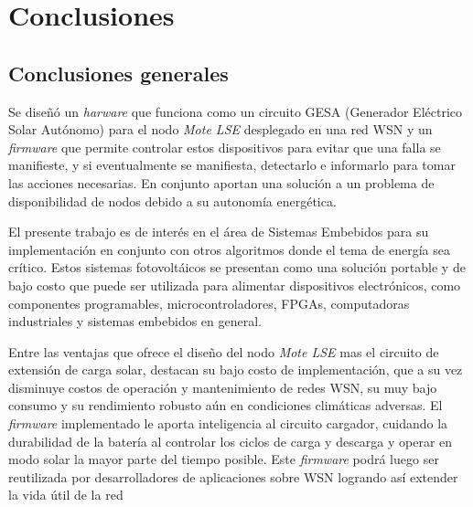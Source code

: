 
\chapter{Conclusiones} %

\label{Chapter5} %

\section{Conclusiones generales}

Se diseñó un \textit{harware} que funciona como un circuito GESA (Generador Eléctrico Solar Autónomo) para el nodo \textit{Mote LSE} desplegado en una red WSN y un \textit{firmware} que permite controlar estos dispositivos para evitar que una falla se manifieste, y si eventualmente se manifiesta, detectarlo e informarlo para tomar las acciones necesarias. En conjunto aportan una solución a un problema de disponibilidad de nodos debido a su autonomía energética.


El presente trabajo es de interés en el área de Sistemas Embebidos para su implementación en conjunto con otros algoritmos donde el tema de energía sea crítico. Estos sistemas fotovoltáicos se presentan como una solución portable y de bajo costo que puede ser utilizada para alimentar dispositivos electrónicos, como componentes programables, microcontroladores, FPGAs, computadoras industriales y sistemas embebidos en general.

Entre las ventajas que ofrece el diseño del nodo \textit{Mote LSE} mas el circuito de extensión de carga solar, destacan su bajo costo de implementación, que a su vez disminuye costos de operación y mantenimiento de redes WSN, su muy bajo consumo y su rendimiento robusto aún en condiciones climáticas adversas. El \textit{firmware} implementado le aporta inteligencia al circuito cargador, cuidando la durabilidad de la batería al controlar los ciclos de carga y descarga y operar en modo solar la mayor parte del tiempo posible. Este \textit{firmware} podrá luego ser reutilizada por desarrolladores de aplicaciones sobre WSN logrando así extender la vida útil de la red


